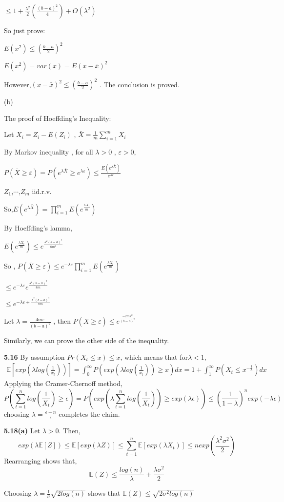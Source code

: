 $\leq 1+\frac{\lambda^2}{2}(\frac{(b-a)^2}{4})+O(\lambda^2)$

So just prove:

$E(x^2)\leq (\frac{b-a}{2})^2$

$E(x^2)=var(x)=E(x-\bar{x})^2$

However,$(x-\bar{x})^2\leq(\frac{b-a}{2})^2$ . The conclusion is proved.

(b)

The proof of Hoeffding's Inequality:

Let $X_i = Z_i - E(Z_i)$ , $\bar{X} = \frac{1}{m}\sum_{i=1}^{m}X_i$

By Markov inequality , for all $\lambda >0$ , $\varepsilon > 0$,

$P(\bar{X}\geq\varepsilon) = P(e^{\lambda \bar{X}} \geq e^{\lambda\varepsilon}) \leq \frac{E(e^{\lambda \bar{X}})}{e^{\lambda\varepsilon}}$

$Z_1$,$\cdots$,$Z_m$ iid.r.v.

So,$E(e^{\lambda \bar{X}}) = \prod_{i=1}^{m} E(e^{\frac{\lambda X_i}{m}})$

By Hoeffding's lamma,

$ E(e^{\frac{\lambda X_i}{m}}) \leq e^{\frac{\lambda^2(b-a)^2}{8m^2}}$

So , $P(\bar{X}\geq\varepsilon) \leq e^{-\lambda\varepsilon}\prod_{i=1}^{m} E(e^{\frac{\lambda X_i}{m}})$

$\leq e^{-\lambda\varepsilon}e^{\frac{\lambda^2(b-a)^2}{8m}}$

$\leq e^{-\lambda\varepsilon+\frac{\lambda^2(b-a)^2}{8m}}$

Let $\lambda = \frac{4m\varepsilon}{(b-a)^2}$ , then $P(\bar{X}\geq \varepsilon) \leq e^{\frac{-2m\varepsilon^2}{(b-a)^2}}$

Similarly, we can prove the other side of the inequality.


\noindent \textbf{5.16}
By assumption $Pr(X_t\leq x)\leq x$, which means that for$\lambda <1$,
\begin{align}
\mathbb{E}\left[exp(\lambda log(\frac{1}{x_t}))\right] = \int_0^\infty P(exp(\lambda log(\frac{1}{x_t}))\geq x)dx = 1 +\int_1^\infty P(X_t \leq x^{-\frac{1}{\lambda}})dx
\end{align}
Applying the Cramer-Chernoff method,
$$P\left(\sum_{t=1}^n log(\frac{1}{X_t}) \geq \epsilon\right) = P\left(exp(\lambda \sum_{t=1}^n log(\frac{1}{X_t})) \geq exp(\lambda \epsilon) \right) \leq \left(\frac{1}{1-\lambda}\right)^n exp (-\lambda \epsilon)$$
choosing $\lambda  = \frac{\epsilon-n}{\epsilon}$ completes the claim.



\noindent \textbf{5.18(a)}
Let $\lambda >0$. Then,
$$exp(\lambda \mathbb{E}[Z]) \leq \mathbb{E}[exp(\lambda Z)] \leq \sum_{t=1}^n \mathbb{E}[exp(\lambda X_t)] \leq n exp(\frac{\lambda^2 \sigma^2}{2})$$
\noindent
Rearranging shows that,
$$\mathbb{E}(Z) \leq \frac{log(n)}{\lambda} + \frac{\lambda \sigma^2}{2}$$
\newline

\noindent
Choosing $\lambda = \frac{1}{\sigma} \sqrt{2log(n)}$ shows  that $
\mathbb{E}(Z) \leq \sqrt{2\sigma^2 log(n)}$
